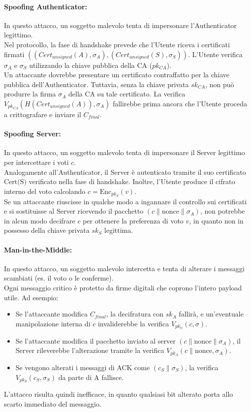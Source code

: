 \paragraph{Spoofing Authenticator:}
In questo attacco, un soggetto malevolo tenta di impersonare l'Authenticator legittimo. \\
Nel protocollo, la fase di handshake prevede che l'Utente riceva i certificati firmati $((Cert_{unsigned}(A), \sigma_A), (Cert_{unsigned}(S), \sigma_S))$. L'Utente verifica $\sigma_A$ e $\sigma_S$ utilizzando la chiave pubblica della CA ($pk_{CA}$). \\
Un attaccante dovrebbe presentare un certificato contraffatto per la chiave pubblica dell'Authenticator. Tuttavia, senza la chiave privata $sk_{CA}$, non può produrre la firma $\sigma_A$ della CA su tale certificato. La verifica $V_{pk_{CA}}(H(Cert_{unsigned}(A)), \sigma_A)$ fallirebbe prima ancora che l'Utente proceda a crittografare e inviare il $C_{final}$.

\paragraph{Spoofing Server:}
In questo attacco, un soggetto malevolo tenta di impersonare il Server legittimo per intercettare i voti $c$. \\
Analogamente all'Authenticator, il Server è autenticato tramite il suo certificato $\text{Cert(S)}$ verificato nella fase di handshake. Inoltre, l'Utente produce il cifrato interno del voto calcolando $c = \text{Enc}_{pk_S}(v)$. \\
Se un attaccante riuscisse in qualche modo a ingannare il controllo sui certificati e si sostituisse al Server ricevendo il pacchetto $(c \| \text{nonce} \| \sigma_A)$, non potrebbe in alcun modo decifrare $c$ per ottenere la preferenza di voto $v$, in quanto non in possesso della chiave privata $sk_S$ legittima.

\paragraph{Man-in-the-Middle:}
In questo attacco, un soggetto malevolo intercetta e tenta di alterare i messaggi scambiati (es. il voto o le conferme). \\
Ogni messaggio critico è protetto da firme digitali che coprono l'intero payload utile. Ad esempio:
\begin{itemize}
    \item Se l'attaccante modifica $C_{final}$, la decifratura con $sk_A$ fallirà, e un'eventuale manipolazione interna di $c$ invaliderebbe la verifica $V_{pk_U}(c, \sigma)$.
    \item Se l'attaccante modifica il pacchetto inviato al server $(c \| \text{nonce} \| \sigma_A)$, il Server rileverebbe l'alterazione tramite la verifica $V_{pk_A}(c \| \text{nonce}, \sigma_A)$.
    \item Se vengono alterati i messaggi di ACK come $(c_S \| \sigma_S)$, la verifica $V_{pk_S}(c_S, \sigma_S)$ da parte di A fallisce.
\end{itemize}
L'attacco risulta quindi inefficace, in quanto qualsiasi bit alterato porta allo scarto immediato del messaggio.

